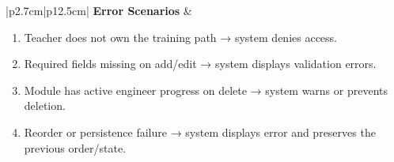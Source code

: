 \begin{table}[H]
\begin{tabular}{|p{2.7cm}|p{12.5cm}|}
        \hline
        \textbf{Error Scenarios} &
        \begin{minipage}[t]{\linewidth}
            \begin{enumerate}[topsep=0pt,itemsep=1pt,parsep=0pt,partopsep=0pt]
                \item Teacher does not own the training path → system denies access.
                \item Required fields missing on add/edit → system displays validation errors.
                \item Module has active engineer progress on delete → system warns or prevents deletion.
                \item Reorder or persistence failure → system displays error and preserves the previous order/state.
            \end{enumerate}
        \end{minipage} \\
        \hline
    \end{tabular}
    \label{tab:teacher-manage-modules}
\end{table}
 
